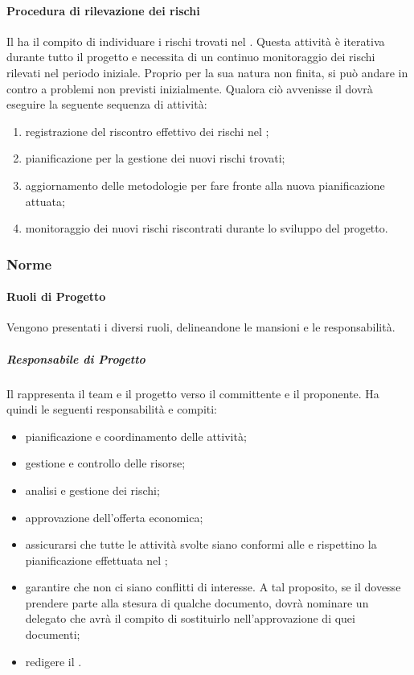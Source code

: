 			\paragraph{Procedura di rilevazione dei rischi}
			Il \roleProjectManager{} ha il compito di individuare i rischi trovati nel \docNameVersionPdP. \newline
			Questa attività è iterativa durante tutto il progetto e necessita di un continuo monitoraggio dei rischi rilevati nel periodo iniziale. Proprio per la sua natura non finita, si può andare in contro a problemi non previsti inizialmente. \newline
			Qualora ciò avvenisse il \roleProjectManager{} dovrà eseguire la seguente sequenza di attività:
				\begin{enumerate}
					\item registrazione del riscontro effettivo dei rischi nel \docNameVersionPdP;
					\item pianificazione per la gestione dei nuovi rischi trovati;
					\item aggiornamento delle metodologie per fare fronte alla nuova pianificazione attuata;
					\item monitoraggio dei nuovi rischi riscontrati durante lo sviluppo del progetto.
				\end{enumerate}

		\subsubsection{Norme}
			\paragraph{Ruoli di Progetto}
			\label{par:ruoli_di_progetto}
			Vengono presentati i diversi ruoli, delineandone le mansioni e le responsabilità.
				\subparagraph{Responsabile di Progetto}
				Il \roleProjectManager{} rappresenta il team e il progetto verso il committente e il proponente. \newline
				Ha quindi le seguenti responsabilità e compiti:
					\begin{itemize}
						\item pianificazione e coordinamento delle attività;
						\item gestione e controllo delle risorse;
						\item analisi e gestione dei rischi;
						\item approvazione dell'offerta economica;
						\item assicurarsi che tutte le attività svolte siano conformi alle \docNameVersionNdP{} e rispettino la pianificazione effettuata nel \docNameVersionPdP;
						\item garantire che non ci siano conflitti di interesse. A tal proposito, se il \roleProjectManager{} dovesse prendere parte alla stesura di qualche documento, dovrà nominare un \roleProjectManager{} delegato che avrà il compito di sostituirlo nell'approvazione di quei documenti;
						\item redigere il \docNameVersionPdP.
					\end{itemize}

